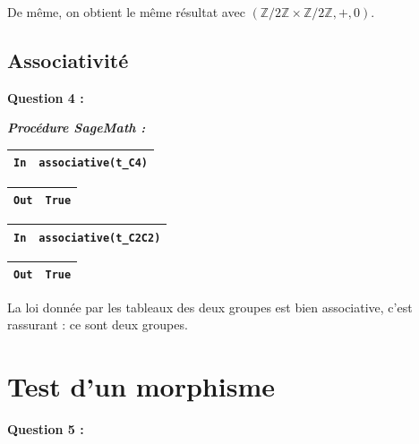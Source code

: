 \documentclass[titlepage]{article}
\begin{document}
        De même, on obtient le même résultat avec $(\mathbb{Z}/2\mathbb{Z} \times \mathbb{Z}/2\mathbb{Z}, +, 0)$. \newline


        \subsection{Associativité}
        \textbf{Question 4 :}

        \emph{\textbf{Procédure SageMath :}}

        

        \begin{tabularx}{11.5cm}{|p{0.60cm}|X|}
            \hline
            \verb|In|
            & 
            \verb|associative(t_C4)|
            \\
            \hline
        \end{tabularx}

        \begin{tabularx}{11.5cm}{|p{0.60cm}|X|}
            \hline
            \verb|Out|
            & 
            \verb|True|
            \\
            \hline
        \end{tabularx}\newline

        \begin{tabularx}{11.5cm}{|p{0.60cm}|X|}
            \hline
            \verb|In|
            & 
            \verb|associative(t_C2C2)|
            \\
            \hline
        \end{tabularx}

        \begin{tabularx}{11.5cm}{|p{0.60cm}|X|}
            \hline
            \verb|Out|
            & 
            \verb|True|
            \\
            \hline
        \end{tabularx}\newline

        La loi donnée par les tableaux des deux groupes est bien associative, c'est rassurant : ce sont deux groupes.

    \section{Test d'un morphisme}
    \textbf{Question 5 :}
\end{document}
